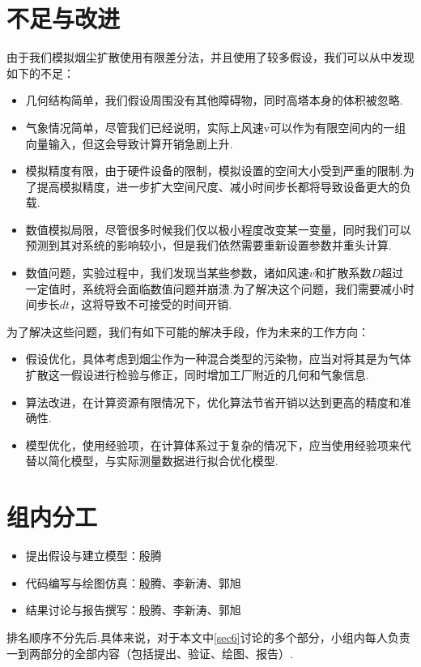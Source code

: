 \documentclass{article}
\begin{document}
	\section{不足与改进}
	\noindent 由于我们模拟烟尘扩散使用有限差分法，并且使用了较多假设，我们可以从中发现如下的不足：
	\begin{itemize}
		\item 几何结构简单，我们假设周围没有其他障碍物，同时高塔本身的体积被忽略.
		\item 气象情况简单，尽管我们已经说明，实际上风速v可以作为有限空间内的一组向量输入，但这会导致计算开销急剧上升.
		\item 模拟精度有限，由于硬件设备的限制，模拟设置的空间大小受到严重的限制.为了提高模拟精度，进一步扩大空间尺度、减小时间步长都将导致设备更大的负载.
		\item 数值模拟局限，尽管很多时候我们仅以极小程度改变某一变量，同时我们可以预测到其对系统的影响较小，但是我们依然需要重新设置参数并重头计算.
		\item 数值问题，实验过程中，我们发现当某些参数，诸如风速$v$和扩散系数$D$超过一定值时，系统将会面临数值问题并崩溃.为了解决这个问题，我们需要减小时间步长$dt$，这将导致不可接受的时间开销.
	\end{itemize}
	为了解决这些问题，我们有如下可能的解决手段，作为未来的工作方向：
	\begin{itemize}
		\item 假设优化，具体考虑到烟尘作为一种混合类型的污染物，应当对将其是为气体扩散这一假设进行检验与修正，同时增加工厂附近的几何和气象信息.
		\item 算法改进，在计算资源有限情况下，优化算法节省开销以达到更高的精度和准确性.
		\item 模型优化，使用经验项，在计算体系过于复杂的情况下，应当使用经验项来代替以简化模型，与实际测量数据进行拟合优化模型.
	\end{itemize}

	\section{组内分工}
	
	\begin{itemize}
		\item 提出假设与建立模型：殷腾
		\item 代码编写与绘图仿真：殷腾、李新涛、郭旭
		\item 结果讨论与报告撰写：殷腾、李新涛、郭旭
	\end{itemize}
	排名顺序不分先后.具体来说，对于本文中\cref{sec6}讨论的多个部分，小组内每人负责一到两部分的全部内容（包括提出、验证、绘图、报告）.
	
\end{document}
